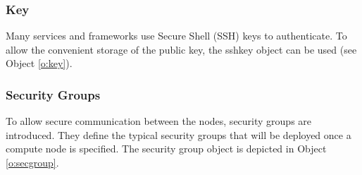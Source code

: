 \documentclass[10pt]{article}
\begin{document}
\subsubsection{Key}

Many services and frameworks use Secure Shell (SSH) keys to authenticate. To allow
the convenient storage of the public key, the sshkey object can be
used (see Object \ref{o:key}).


\subsubsection{Security Groups}

To allow secure communication between the nodes, security groups are
introduced. They define the typical security groups that will be
deployed once a compute node is specified. The security group object
is depicted in Object \ref{o:secgroup}.




%
%
%








\end{document}
